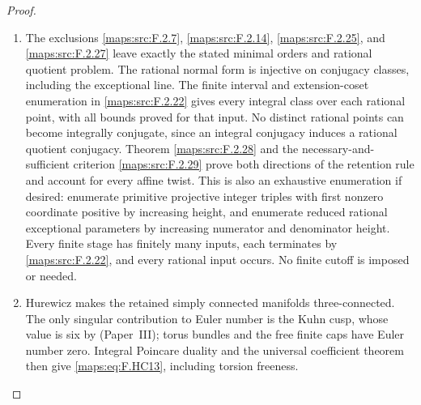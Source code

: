 \documentclass[11pt,a4paper]{article}
\theoremstyle{definition}
\newcommand{\ExternalPaperRef}[3]{\ifmmode\text{\upshape #1#2 (Paper~#3)}\else #1#2 (Paper~#3)\fi}
\begin{document}
\begin{proof}
\begin{enumerate}[label=\arabic*.]
\item The exclusions \ref{maps:src:F.2.7}, \ref{maps:src:F.2.14}, \ref{maps:src:F.2.25}, and \ref{maps:src:F.2.27}
leave exactly the stated minimal orders and rational
quotient problem.
The rational normal form is injective on conjugacy
classes, including the exceptional line.
The finite interval and extension-coset enumeration
in \ref{maps:src:F.2.22} gives every integral class over each rational
point, with all bounds proved for that input.
No distinct rational points can become integrally
conjugate, since an integral conjugacy induces a
rational quotient conjugacy.
Theorem \ref{maps:src:F.2.28} and the necessary-and-sufficient
criterion \ref{maps:src:F.2.29} prove both directions of the
retention rule and account for every affine twist.
This is also an exhaustive enumeration if desired:
enumerate primitive projective integer triples with
first nonzero coordinate positive by increasing height,
and enumerate reduced rational exceptional parameters
by increasing numerator and denominator height.
Every finite stage has finitely many inputs, each
terminates by \ref{maps:src:F.2.22}, and every rational input occurs.
No finite cutoff is imposed or needed.

\item Hurewicz makes the retained simply connected manifolds
three-connected.  The only singular contribution to
Euler number is the Kuhn cusp, whose value is six
by \ExternalPaperRef{}{6.3}{III}; torus bundles and the free finite caps have
Euler number zero.
Integral Poincare duality and the universal coefficient
theorem then give \eqref{maps:eq:F.HC13}, including torsion freeness.


\end{enumerate}
\end{proof}
\end{document}
